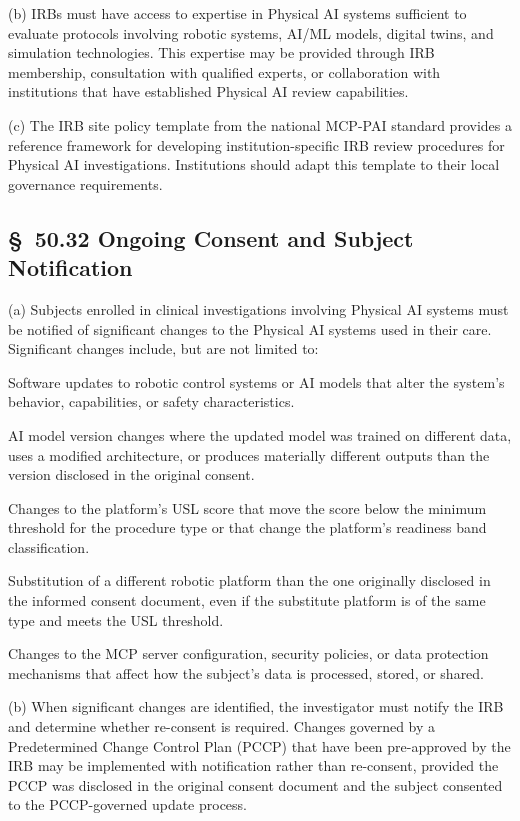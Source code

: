 (b) IRBs must have access to expertise in Physical AI systems sufficient to evaluate protocols involving robotic systems, AI/ML models, digital twins, and simulation technologies. This expertise may be provided through IRB membership, consultation with qualified experts, or collaboration with institutions that have established Physical AI review capabilities.

(c) The IRB site policy template from the national MCP-PAI standard provides a reference framework for developing institution-specific IRB review procedures for Physical AI investigations. Institutions should adapt this template to their local governance requirements.

\subsection{\S~50.32 Ongoing Consent and Subject Notification}

(a) Subjects enrolled in clinical investigations involving Physical AI systems must be notified of significant changes to the Physical AI systems used in their care. Significant changes include, but are not limited to:

\begin{description}[leftmargin=1.0cm,style=sameline]
\item[(1)] Software updates to robotic control systems or AI models that alter the system's behavior, capabilities, or safety characteristics.
\item[(2)] AI model version changes where the updated model was trained on different data, uses a modified architecture, or produces materially different outputs than the version disclosed in the original consent.
\item[(3)] Changes to the platform's USL score that move the score below the minimum threshold for the procedure type or that change the platform's readiness band classification.
\item[(4)] Substitution of a different robotic platform than the one originally disclosed in the informed consent document, even if the substitute platform is of the same type and meets the USL threshold.
\item[(5)] Changes to the MCP server configuration, security policies, or data protection mechanisms that affect how the subject's data is processed, stored, or shared.
\end{description}

(b) When significant changes are identified, the investigator must notify the IRB and determine whether re-consent is required. Changes governed by a Predetermined Change Control Plan (PCCP) that have been pre-approved by the IRB may be implemented with notification rather than re-consent, provided the PCCP was disclosed in the original consent document and the subject consented to the PCCP-governed update process.

